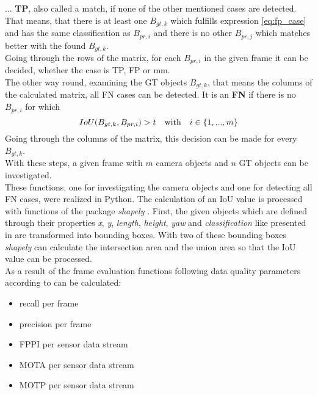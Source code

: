... \textbf{TP}, also called a match, if none of the other mentioned cases are detected. That means, that there is at least one $B_{gt,k}$ which fulfills expression \cref{eq:fp_case} and has the same classification as $B_{pr,i}$ and there is no other $B_{pr,j}$ which matches better with the found $B_{gt,k}$. \\

Going through the rows of the matrix, for each $B_{pr,i}$ in the given frame it can be decided, whether the case is TP, FP or mm. \\

The other way round, examining the \ac{GT} objects $B_{gt,k}$, that means the columns of the calculated matrix, all FN cases can be detected. It is an \textbf{FN} if there is no $B_{pr,i}$ for which
\begin{equation}
	IoU(B_{gt,k}, B_{pr,i}) > t \text{\quad with\quad} i \in \left\lbrace 1, ..., m\right\rbrace 
	\label{eq:fn_case}
\end{equation}
Going through the columns of the matrix, this decision can be made for every $B_{gt,k}$. \\
With these steps, a given frame with $m$ camera objects and $n$ \ac{GT} objects can be investigated. \\

These functions, one for investigating the camera objects and one for detecting all FN cases, were realized in Python. The calculation of an IoU value is processed with functions of the package \textit{shapely} \cite{Shapely}.
First, the given objects which are defined through their properties \textit{x}, \textit{y}, \textit{length}, \textit{height}, \textit{yaw} and \textit{classification} like presented in \cite{Aeberhard}
are transformed into bounding boxes. With two of these bounding boxes \textit{shapely} can calculate the intersection area and the union area so that the IoU value can be processed. \\

As a result of the frame evaluation functions following data quality parameters according to \cite{Reway} can be calculated:
\begin{itemize}
	
	\item recall per frame
	\item precision per frame
	\item FPPI per sensor data stream 
	\item MOTA per sensor data stream 
	\item MOTP per sensor data stream 
	
\end{itemize}

